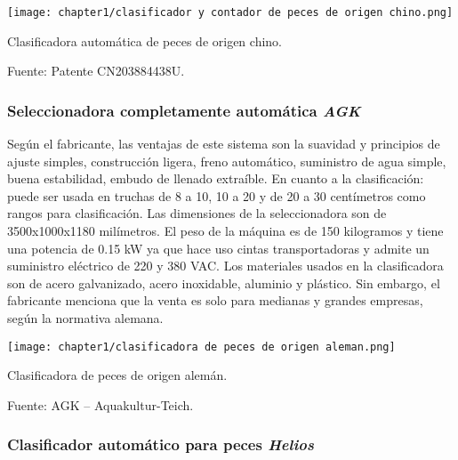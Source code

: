 \begin{myfigure}[H]
	\footnotesize\centering
	\texttt{[image: chapter1/clasificador y contador de peces de origen chino.png]}
	\caption{Clasificadora automática de peces de origen chino.}
	\begin{myflushcenter}
		Fuente: Patente CN203884438U.
	\end{myflushcenter}
	\label{fig:clasificador y contador de peces de origen chino}
\end{myfigure}

\subsubsection{Seleccionadora completamente automática \textit{AGK}}

Según el fabricante, las ventajas de este sistema son la suavidad y principios de ajuste simples, construcción ligera, freno automático, suministro de agua simple, buena estabilidad, embudo de llenado extraíble. En cuanto a la clasificación: puede ser usada en truchas de 8 a 10, 10 a 20 y de 20 a 30 centímetros como rangos para clasificación. Las dimensiones de la seleccionadora son de 3500x1000x1180 milímetros. El peso de la máquina es de 150 kilogramos y tiene una potencia de 0.15 kW ya que hace uso cintas transportadoras y admite un suministro eléctrico de 220 y 380 VAC. Los materiales usados en la clasificadora son de acero galvanizado, acero inoxidable, aluminio y plástico.\citep{AGKAquakultur-Teich2010} Sin embargo, el fabricante menciona que la venta es solo para medianas y grandes empresas, según la normativa alemana.

\begin{myfigure}[H]
	\footnotesize\centering
	\texttt{[image: chapter1/clasificadora de peces de origen aleman.png]}
	\caption{Clasificadora de peces de origen alemán.}
	\begin{myflushcenter}		
		Fuente: AGK – Aquakultur-Teich.
	\end{myflushcenter}
	\label{fig:clasificadora de peces de origen aleman}
\end{myfigure}

\subsubsection{Clasificador automático para peces \textit{Helios}}
\label{sssec:clasificador automatico para peces helios}

